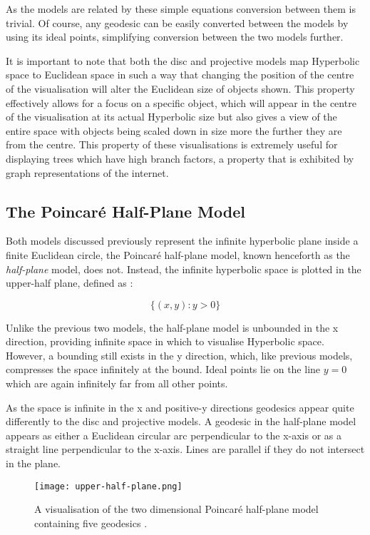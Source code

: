 As the models are related by these simple equations conversion between them is trivial. Of course, any geodesic can be easily converted between the models by using its ideal points, simplifying conversion between the two models further.

It is important to note that both the disc and projective models map Hyperbolic space to Euclidean space in such a way that changing the position of the centre of the visualisation will alter the Euclidean size of objects shown. This property effectively allows for a focus on a specific object, which will appear in the centre of the visualisation at its actual Hyperbolic size but also gives a view of the entire space with objects being scaled down in size more the further they are from the centre. This property of these visualisations is extremely useful for displaying trees which have high branch factors, a property that is exhibited by graph representations of the internet.

\subsection{The Poincar\'{e} Half-Plane Model}

Both models discussed previously represent the infinite hyperbolic plane inside a finite Euclidean circle, the Poincar\'{e} half-plane model, known henceforth as the \textit{half-plane} model, does not. Instead, the infinite hyperbolic space is plotted in the upper-half plane, defined as \cite{kubo_geometry_1988}:

\begin{equation}
\label{upper_half_plane}
\{(x,y):y>0\}
\end{equation}

Unlike the previous two models, the half-plane model is unbounded in the x direction, providing infinite space in which to visualise Hyperbolic space. However, a bounding still exists in the y direction, which, like previous models, compresses the space infinitely at the bound. Ideal points lie on the line $y=0$ which are again infinitely far from all other points.

As the space is infinite in the x and positive-y directions geodesics appear quite differently to the disc and projective models. A geodesic in the half-plane model appears as either a Euclidean circular arc perpendicular to the x-axis or as a straight line perpendicular to the x-axis. Lines are parallel if they do not intersect in the plane.
\begin{figure}
	\centering
	\texttt{[image: upper-half-plane.png]}
	\caption[A visualisation of the two dimensional Poincar\'{e} half-plane model containing five geodesics]{A visualisation of the two dimensional Poincar\'{e} half-plane model containing five geodesics .}
	\label{fig:half-plane-example}
\end{figure}

